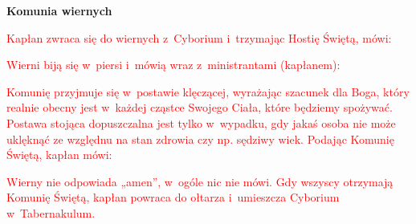 \begin{center}
\textbf{Komunia wiernych}
\end{center}

\begin{center}
\textcolor{red}{Kapłan zwraca się do wiernych z~Cyborium i~trzymając Hostię Świętą, mówi:}
\end{center}

\begin{Parallel}[v]{0.485\textwidth}{0.485\textwidth}

\end{Parallel}

\begin{center}
\textcolor{red}{Wierni biją się w~piersi i~mówią wraz z~ministrantami (kapłanem):}
\end{center}

\begin{Parallel}[v]{0.485\textwidth}{0.485\textwidth}

\end{Parallel}

\begin{center}
\textcolor{red}{Komunię przyjmuje się w~postawie klęczącej, wyrażając szacunek dla Boga, który realnie obecny jest w~każdej cząstce Swojego Ciała, które będziemy spożywać. Postawa stojąca dopuszczalna jest tylko w~wypadku, gdy jakaś osoba nie może uklęknąć ze względnu na stan zdrowia czy np. sędziwy wiek. Podając Komunię Świętą, kapłan mówi:}
\end{center}

\begin{Parallel}[v]{0.485\textwidth}{0.485\textwidth}

\end{Parallel}

\begin{center}
\textcolor{red}{Wierny nie odpowiada „amen”, w~ogóle nic nie mówi. Gdy wszyscy otrzymają Komunię Świętą, kapłan powraca do ołtarza i~umieszcza Cyborium w~Tabernakulum.}
\end{center}

